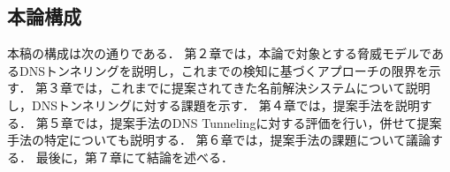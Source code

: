 



\subsection{本論構成}
本稿の構成は次の通りである．
第２章では，本論で対象とする脅威モデルであるDNSトンネリングを説明し，これまでの検知に基づくアプローチの限界を示す．
第３章では，これまでに提案されてきた名前解決システムについて説明し，DNSトンネリングに対する課題を示す．
第４章では，提案手法を説明する．
第５章では，提案手法のDNS Tunnelingに対する評価を行い，併せて提案手法の特定についても説明する．
第６章では，提案手法の課題について議論する．
最後に，第７章にて結論を述べる．
